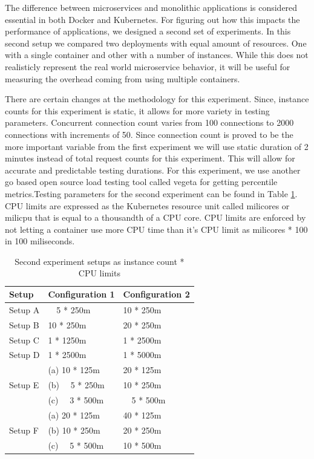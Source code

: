 \documentclass[12pt,oneandhalf,chaparabic,ceng,ms,eng,oneside,pntc]{gsufbe}
\begin{document}
The difference between microservices and monolithic applications is considered essential in both Docker
and Kubernetes. For figuring out how this impacts the performance of applications, we designed a second 
set of experiments. In this second setup we compared two deployments with equal amount of resources. One with
a single container and other with a number of instances. While this does not realisticly represent the
real world
microservice behavior, it will be useful for measuring the overhead coming from using multiple containers.

There are certain changes at the methodology for this experiment. Since, instance counts for this experiment
is static, it allows for more variety in testing parameters. Concurrent connection count varies
from 100 connections to 2000 connections with increments of 50. Since connection count is proved to be the more
important variable from the first experiment we will use static duration of 2 minutes instead of total request
counts for this experiment. This will 
allow for accurate and predictable testing durations. For this experiment, we use another go based
open source load testing tool called vegeta for getting percentile metrics.Testing parameters for the second
experiment can be found in Table \ref{secondexp}. CPU limits are expressed as the Kubernetes resource unit
called milicores or milicpu that is equal to a thousandth of a CPU core. CPU limits are enforced by not
letting a container use more CPU time than it's CPU limit as milicores * 100 in 100 miliseconds.

\begin{table}[h]
\caption{Second experiment setups as instance count * CPU limits}
\centering
\begin{tabular}{ |l|l|l| }
\hline
Setup & Configuration 1 & Configuration 2 \\ \hline
Setup A &  ~~5 *  250m & 10 *  250m \\
Setup B & 10 *  250m &  20 *  250m \\
Setup C &  1 * 1250m &   1 * 2500m \\
Setup D &  1 * 2500m &   1 * 5000m \\ \hline
\multirow{3}{*}{Setup E} 
 &(a) 10 *  125m & 20 *  125m \\
 &(b)  ~~5 *  250m & 10 *  250m \\
 &(c)  ~~3 *  500m & ~~5 *  500m \\ \hline
\multirow{3}{*}{Setup F}
 &(a) 20 *  125m & 40 *  125m \\
 &(b) 10 *  250m & 20 *  250m \\
 &(c)  ~~5 *  500m & 10 *  500m \\ \hline
\end{tabular}
\label{secondexp}
\end{table}
\end{document}
